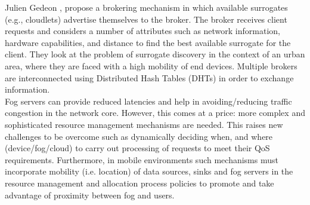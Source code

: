 \noindent\tab Julien Gedeon \cite{gedeon2017router}, propose a brokering mechanism in which available surrogates (e.g., cloudlets) advertise themselves to the broker. The broker receives client requests and considers a number of attributes such as network information, hardware capabilities, and distance to find the best available surrogate for the client. They look at the problem of surrogate discovery in the context of an urban area, where they are faced with a high mobility of end devices. Multiple brokers are interconnected using Distributed Hash Tables (DHTs) in order to exchange information.\\

\noindent\tab Fog servers can provide reduced latencies and help in avoiding/reducing traffic congestion in the network core. However, this comes at a price: more complex and sophisticated resource management mechanisms are needed. This raises new challenges to be overcome such as dynamically deciding when, and where (device/fog/cloud) to carry out processing of requests to meet their QoS requirements. Furthermore, in mobile environments such mechanisms must incorporate mobility (i.e. location) of data sources, sinks and fog servers in the resource management and allocation process policies to promote and take advantage of proximity between fog and users.